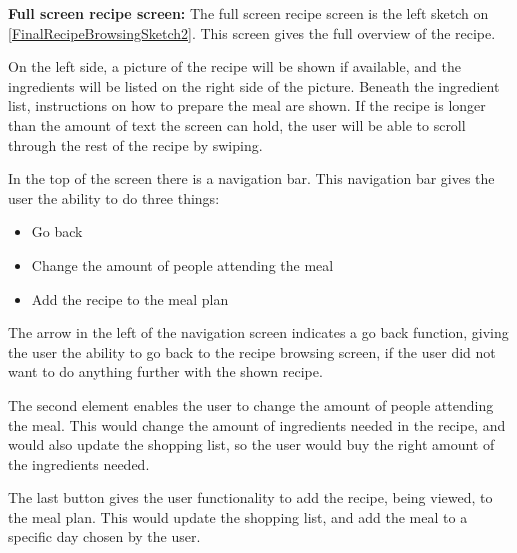 \textbf{Full screen recipe screen:} The full screen recipe screen is the left sketch on \cref{FinalRecipeBrowsingSketch2}. This screen gives the full overview of the recipe.

On the left side, a picture of the recipe will be shown if available, and the ingredients will be listed on the right side of the picture. Beneath the ingredient list, instructions on how to prepare the meal are shown. If the recipe is longer than the amount of text the screen can hold, the user will be able to scroll through the rest of the recipe by swiping.

In the top of the screen there is a navigation bar. This navigation bar gives the user the ability to do three things:

\begin{itemize}
    \item Go back
    \item Change the amount of people attending the meal
    \item Add the recipe to the meal plan
\end{itemize}

The arrow in the left of the navigation screen indicates a go back function, giving the user the ability to go back to the recipe browsing screen, if the user did not want to do anything further with the shown recipe.

The second element enables the user to change the amount of people attending the meal. This would change the amount of ingredients needed in the recipe, and would also update the shopping list, so the user would buy the right amount of the ingredients needed.

The last button gives the user functionality to add the recipe, being viewed, to the meal plan. This would update the shopping list, and add the meal to a specific day chosen by the user.